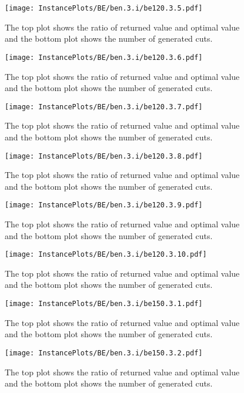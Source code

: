 \documentclass[10pt,a4paper]{article}
\begin{document}
\begin{figure}[H]
\texttt{[image: InstancePlots/BE/ben.3.i/be120.3.5.pdf]}
\caption{The top plot shows the ratio of returned value and optimal value     and the bottom plot shows the number of generated cuts.}
\end{figure}

\begin{figure}[H]
\texttt{[image: InstancePlots/BE/ben.3.i/be120.3.6.pdf]}
\caption{The top plot shows the ratio of returned value and optimal value     and the bottom plot shows the number of generated cuts.}
\end{figure}

\begin{figure}[H]
\texttt{[image: InstancePlots/BE/ben.3.i/be120.3.7.pdf]}
\caption{The top plot shows the ratio of returned value and optimal value     and the bottom plot shows the number of generated cuts.}
\end{figure}

\begin{figure}[H]
\texttt{[image: InstancePlots/BE/ben.3.i/be120.3.8.pdf]}
\caption{The top plot shows the ratio of returned value and optimal value     and the bottom plot shows the number of generated cuts.}
\end{figure}

\begin{figure}[H]
\texttt{[image: InstancePlots/BE/ben.3.i/be120.3.9.pdf]}
\caption{The top plot shows the ratio of returned value and optimal value     and the bottom plot shows the number of generated cuts.}
\end{figure}

\begin{figure}[H]
\texttt{[image: InstancePlots/BE/ben.3.i/be120.3.10.pdf]}
\caption{The top plot shows the ratio of returned value and optimal value     and the bottom plot shows the number of generated cuts.}
\end{figure}

\begin{figure}[H]
\texttt{[image: InstancePlots/BE/ben.3.i/be150.3.1.pdf]}
\caption{The top plot shows the ratio of returned value and optimal value     and the bottom plot shows the number of generated cuts.}
\end{figure}

\begin{figure}[H]
\texttt{[image: InstancePlots/BE/ben.3.i/be150.3.2.pdf]}
\caption{The top plot shows the ratio of returned value and optimal value     and the bottom plot shows the number of generated cuts.}
\end{figure}
\end{document}
